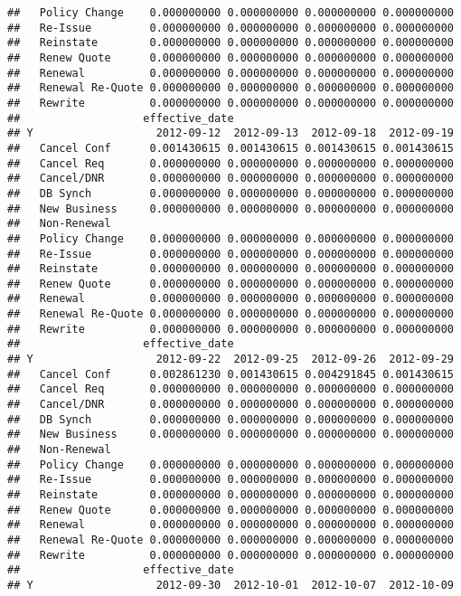 \documentclass[]{article}
\begin{document}
\begin{verbatim}
##   Policy Change    0.000000000 0.000000000 0.000000000 0.000000000
##   Re-Issue         0.000000000 0.000000000 0.000000000 0.000000000
##   Reinstate        0.000000000 0.000000000 0.000000000 0.000000000
##   Renew Quote      0.000000000 0.000000000 0.000000000 0.000000000
##   Renewal          0.000000000 0.000000000 0.000000000 0.000000000
##   Renewal Re-Quote 0.000000000 0.000000000 0.000000000 0.000000000
##   Rewrite          0.000000000 0.000000000 0.000000000 0.000000000
##                   effective_date
## Y                   2012-09-12  2012-09-13  2012-09-18  2012-09-19
##   Cancel Conf      0.001430615 0.001430615 0.001430615 0.001430615
##   Cancel Req       0.000000000 0.000000000 0.000000000 0.000000000
##   Cancel/DNR       0.000000000 0.000000000 0.000000000 0.000000000
##   DB Synch         0.000000000 0.000000000 0.000000000 0.000000000
##   New Business     0.000000000 0.000000000 0.000000000 0.000000000
##   Non-Renewal                                                     
##   Policy Change    0.000000000 0.000000000 0.000000000 0.000000000
##   Re-Issue         0.000000000 0.000000000 0.000000000 0.000000000
##   Reinstate        0.000000000 0.000000000 0.000000000 0.000000000
##   Renew Quote      0.000000000 0.000000000 0.000000000 0.000000000
##   Renewal          0.000000000 0.000000000 0.000000000 0.000000000
##   Renewal Re-Quote 0.000000000 0.000000000 0.000000000 0.000000000
##   Rewrite          0.000000000 0.000000000 0.000000000 0.000000000
##                   effective_date
## Y                   2012-09-22  2012-09-25  2012-09-26  2012-09-29
##   Cancel Conf      0.002861230 0.001430615 0.004291845 0.001430615
##   Cancel Req       0.000000000 0.000000000 0.000000000 0.000000000
##   Cancel/DNR       0.000000000 0.000000000 0.000000000 0.000000000
##   DB Synch         0.000000000 0.000000000 0.000000000 0.000000000
##   New Business     0.000000000 0.000000000 0.000000000 0.000000000
##   Non-Renewal                                                     
##   Policy Change    0.000000000 0.000000000 0.000000000 0.000000000
##   Re-Issue         0.000000000 0.000000000 0.000000000 0.000000000
##   Reinstate        0.000000000 0.000000000 0.000000000 0.000000000
##   Renew Quote      0.000000000 0.000000000 0.000000000 0.000000000
##   Renewal          0.000000000 0.000000000 0.000000000 0.000000000
##   Renewal Re-Quote 0.000000000 0.000000000 0.000000000 0.000000000
##   Rewrite          0.000000000 0.000000000 0.000000000 0.000000000
##                   effective_date
## Y                   2012-09-30  2012-10-01  2012-10-07  2012-10-09

\end{verbatim}
\end{document}
